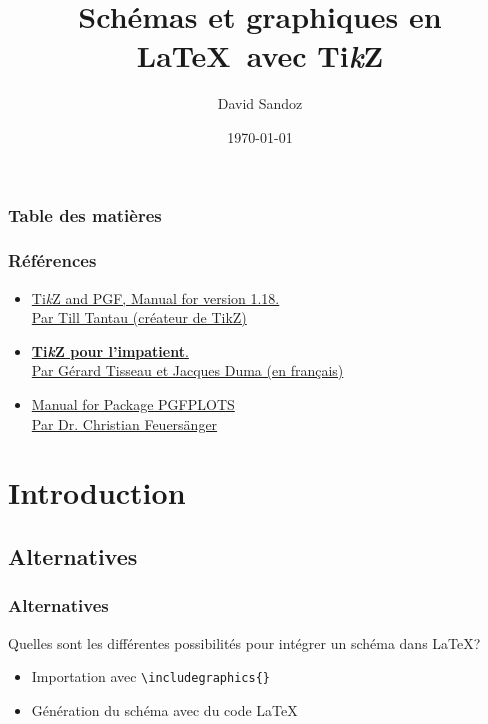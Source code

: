 \documentclass{clic_latex_beamer}
\newcommand{\TikZ}{Ti\textit{k}Z }
\begin{document}
\title{Schémas et graphiques en \LaTeX\ avec \TikZ}
\author{David Sandoz}
\date{\today}
\titlegraphic{\ccbysa}

\frame{\titlepage}


\begin{frame}
\frametitle{Table des matières}
\begin{multicols}{2}
\tableofcontents[]
\end{multicols}
\end{frame}

 
\begin{frame}
\frametitle{Références}
\begin{itemize}
\item \href{http://paws.wcu.edu/tsfoguel/tikzpgfmanual.pdf }{\TikZ and PGF, Manual for version 1.18.\\Par Till Tantau (créateur de TikZ)}
\item \href{http://math.et.info.free.fr/TikZ/bdd/TikZ-Impatient.pdf}{\textbf{\TikZ pour l’impatient}.\\Par Gérard Tisseau et Jacques Duma (en français)}
\item \href{http://pgfplots.sourceforge.net/pgfplots.pdf}{Manual for Package \uppercase{pgfplots}\\Par Dr. Christian Feuersänger}
\end{itemize}
\end{frame}


\section{Introduction}
\subsection{Alternatives}
\begin{frame}
\frametitle{Alternatives}
Quelles sont les différentes possibilités pour intégrer un schéma dans \LaTeX ?
\begin{itemize}
\item Importation avec \texttt{\textbackslash includegraphics\{\}}
\item Génération du schéma avec du code \LaTeX
\end{itemize}
\end{frame}
 
\end{document}
